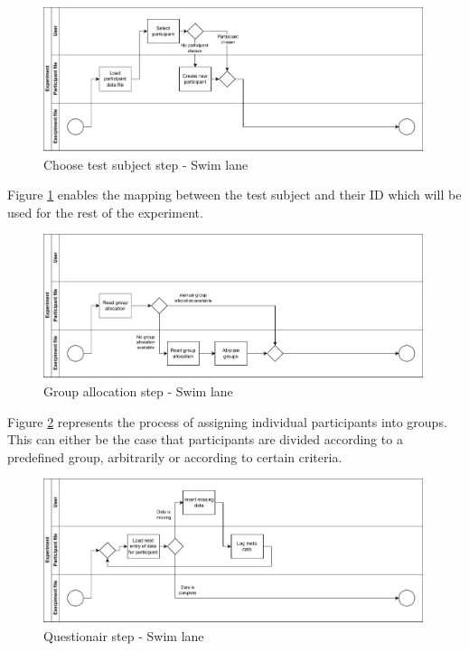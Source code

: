 \begin{figure}[htbp]
    \includegraphics[width=0.99\textwidth, keepaspectratio]{content/05_design_and_dev_artefacts/ChooseTestSubjectSwimLane.drawio.pdf}
    \caption{Choose test subject step - Swim lane}    
    \label{fig:ChooseTestSubjectSwimLane}
\end{figure}

Figure \ref{fig:ChooseTestSubjectSwimLane} enables the mapping between the test subject and their ID which will be used for the rest of the experiment.

\begin{figure}[htbp]
    \includegraphics[width=0.99\textwidth, keepaspectratio]{content/05_design_and_dev_artefacts/GroupAllocationSwimLane.drawio.pdf}
    \caption{Group allocation step - Swim lane}    
    \label{fig:groupAllocationSwimLane}
\end{figure}

Figure \ref{fig:groupAllocationSwimLane} represents the process of assigning individual participants into groups. This can either be the case that participants are divided according to a predefined group, arbitrarily or according to certain criteria.

\begin{figure}[htbp]
    \includegraphics[width=0.99\textwidth, keepaspectratio]{content/05_design_and_dev_artefacts/QuestionairSwimLane.drawio.pdf}
    \caption{Questionair step - Swim lane}    
    \label{fig:questionairSwimLane}
\end{figure}

